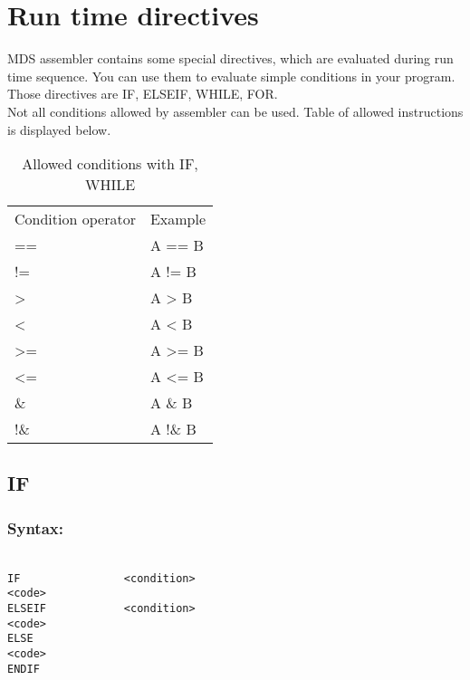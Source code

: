     \section{Run time directives}
    MDS assembler contains some special directives, which are evaluated during run time sequence. You can use them to evaluate simple conditions in your program.
    Those directives are IF, ELSEIF, WHILE, FOR.\\ Not all conditions allowed by assembler can be used.
    Table of allowed instructions is displayed below.
        \begin{table}[h!]
                \mysmallfont{}
                \centering{}
                \begin{tabular}{|l|l}
                \hline
                Condition operator       &          Example  \\
                ==                       &          A ==  B  \\
                !=                       &          A !=  B  \\
                >                        &          A >   B  \\
                <                        &          A <   B  \\
                >=                       &          A >=  B  \\
                <=                       &          A <=  B  \\
                \&                       &          A \&  B  \\
                !\&                      &          A !\& B
                \end{tabular}
                \caption{Allowed conditions with IF, WHILE}
        \end{table}

        \subsection{IF}
            \subsubsection{Syntax:}
            {
                ~\\
                \usecodefont
                \verb'IF                <condition>'\\
                \verb'<code>'\\
                \verb'ELSEIF            <condition>'\\
                \verb'<code>'\\
                \verb'ELSE'\\
                \verb'<code>'\\
                \verb'ENDIF'\\
            }

